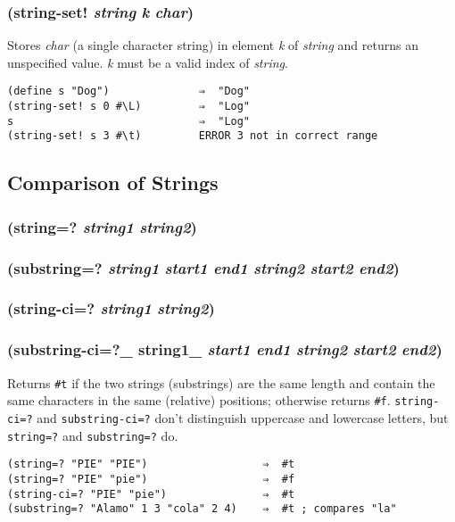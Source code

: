 \documentclass{article}
\begin{document}
\subsubsection{(string-set! \emph{string} \emph{k} \emph{char})}

Stores \emph{char} (a single character string) in element \emph{k} of \emph{string} and
returns an unspecified value. \emph{k} must be a valid index of \emph{string}.

\begin{verbatim}
(define s "Dog")              ⇒  "Dog"
(string-set! s 0 #\L)         ⇒  "Log"
s                             ⇒  "Log"
(string-set! s 3 #\t)         ERROR 3 not in correct range
\end{verbatim}

\subsection{Comparison of Strings}\label{sec:comparison-of-strings}

\subsubsection{(string=? \emph{string1} \emph{string2})}

\subsubsection{(substring=? \emph{string1} \emph{start1} \emph{end1} \emph{string2} \emph{start2} \emph{end2})}

\subsubsection{(string-ci=? \emph{string1} \emph{string2})}

\subsubsection{(substring-ci=?\_ string1\_ \emph{start1} \emph{end1} \emph{string2} \emph{start2} \emph{end2})}

Returns \verb|#t| if the two strings (substrings) are the same length and contain the same
characters in the same (relative) positions; otherwise returns \verb|#f|.
\verb|string-ci=?| and \verb|substring-ci=?| don't distinguish uppercase and lowercase
letters, but \verb|string=?| and \verb|substring=?| do.

\begin{verbatim}
(string=? "PIE" "PIE")                  ⇒  #t
(string=? "PIE" "pie")                  ⇒  #f
(string-ci=? "PIE" "pie")               ⇒  #t
(substring=? "Alamo" 1 3 "cola" 2 4)    ⇒  #t ; compares "la"
\end{verbatim}
\end{document}
